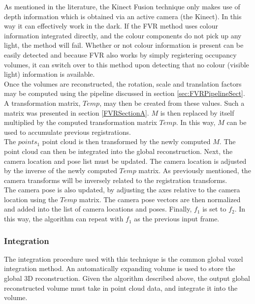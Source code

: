 As mentioned in the literature, the Kinect Fusion technique only makes use of depth information which is obtained via an active camera (the Kinect). In this way it can effectively work in the dark. If the FVR method uses colour information integrated directly, and the colour components do not pick up any light, the method will fail. Whether or not colour information is present can be easily detected and because FVR also works by simply registering occupancy volumes, it can switch over to this method upon detecting that no colour (visible light) information is available. \\

Once the volumes are reconstructed, the rotation, scale and translation factors may be computed using the pipeline discussed in section \ref{sec:FVRPipelineSect}. A transformation matrix, $Temp$, may then be created from these values. Such a matrix was presented in section \ref{FVRSectionA}. $M$ is then replaced by itself multiplied by the computed transformation matrix $Temp$. In this way, $M$ can be used to accumulate previous registrations. \\

The $points_1$ point cloud is then transformed by the newly computed $M$. The point cloud can then be integrated into the global reconstruction. Next, the camera location and pose list must be updated. The camera location is adjusted by the inverse of the newly computed $Temp$ matrix. As previously mentioned, the camera transforms will be inversely related to the registration transforms. \\

The camera pose is also updated, by adjusting the axes relative to the camera location using the $Temp$ matrix. The camera pose vectors are then normalized and added into the list of camera locations and poses. Finally, $f_1$ is set to $f_2$. In this way, the algorithm can repeat with $f_1$ as the previous input frame. \\  



\subsubsection{Integration}

The integration procedure used with this technique is the common global voxel integration method. An automatically expanding volume is used to store the global 3D reconstruction. Given the algorithm described above, the output global reconstructed volume must take in point cloud data, and integrate it into the volume. \\

